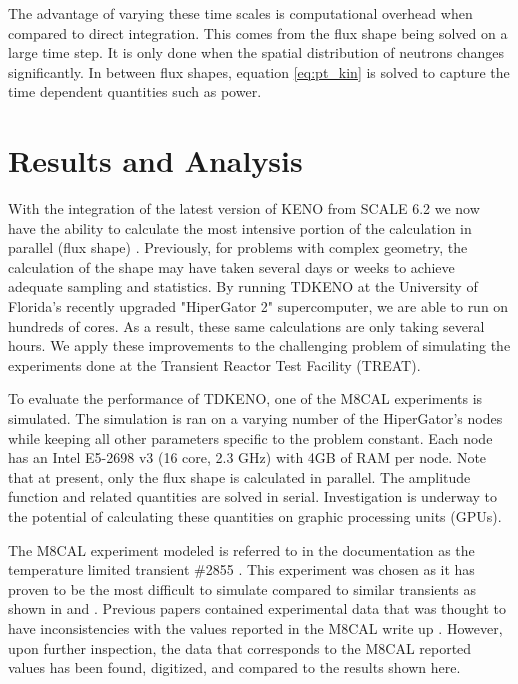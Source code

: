 \documentclass{anstrans}
\begin{document}
The advantage of varying these time scales is computational overhead when compared to direct integration.  This comes from the flux shape being solved on a large time step. It is only done when the spatial distribution of neutrons changes significantly.  In between flux shapes, equation \ref{eq:pt_kin} is solved to capture the time dependent quantities such as power.   

\section{Results and Analysis}
With the integration of the latest version of KENO from SCALE 6.2 we now have the ability to calculate the most intensive portion of the calculation in parallel (flux shape) \cite{rearden2013overview}.  Previously, for problems with complex geometry, the calculation of the shape may have taken several days or weeks to achieve adequate sampling and statistics.  By running TDKENO at the University of Florida's recently upgraded "HiperGator 2" supercomputer, we are able to run on hundreds of cores. As a result, these same calculations are only taking several hours. We apply these improvements to the challenging problem of simulating the experiments done at the Transient Reactor Test Facility (TREAT). 

To evaluate the performance of TDKENO, one of the M8CAL experiments is simulated.  The simulation is ran on a varying number of the HiperGator's nodes while keeping all other parameters specific to the problem constant.  Each node has an Intel E5-2698 v3 (16 core, 2.3 GHz) with 4GB of RAM per node. Note that at present, only the flux shape is calculated in parallel.  The amplitude function and related quantities are solved in serial. Investigation is underway to the potential of calculating these quantities on graphic processing units (GPUs).  

The M8CAL experiment modeled is referred to in the documentation as the temperature limited transient \#2855 \cite{Robinson_Bauer_1994}.  This experiment was chosen as it has proven to be the most difficult to simulate compared to similar transients as shown in \cite{physor_mausolff} and \cite{kontogeorgakos2014treat}.  Previous papers contained experimental data that was thought to have inconsistencies with the values reported in the M8CAL write up \cite{physor_mausolff}\cite{physor_paluch}.  However, upon further inspection, the data that corresponds to the M8CAL reported values has been found, digitized, and compared to the results shown here.
\end{document}
